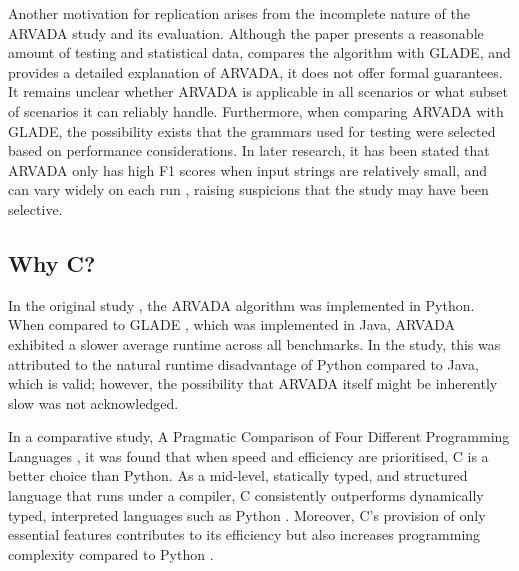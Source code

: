 \vspace{\baselineskip}

Another motivation for replication arises from the incomplete nature of the ARVADA study and its evaluation. Although the paper presents a reasonable amount of testing and statistical data, compares the algorithm with GLADE, and provides a detailed explanation of ARVADA, it does not offer formal guarantees. It remains unclear whether ARVADA is applicable in all scenarios or what subset of scenarios it can reliably handle. Furthermore, when comparing ARVADA with GLADE, the possibility exists that the grammars used for testing were selected based on performance considerations. In later research, it has been stated that ARVADA only has high F1 scores when input strings are relatively small, and can vary widely on each run \cite{arefinFastDeterministicBlackbox2024}, raising suspicions that the study may have been selective.

\subsection{Why C?}

In the original study \cite{kulkarniLearningHighlyRecursive2021}, the ARVADA algorithm was implemented in Python. When compared to GLADE \cite{bastaniSynthesizingProgramInput}, which was implemented in Java, ARVADA exhibited a slower average runtime across all benchmarks. In the study, this was attributed to the natural runtime disadvantage of Python compared to Java, which is valid; however, the possibility that ARVADA itself might be inherently slow was not acknowledged.

\vspace{\baselineskip}

In a comparative study, A Pragmatic Comparison of Four Different Programming Languages \cite{aliPragmaticComparisonFour2021}, it was found that when speed and efficiency are prioritised, C is a better choice than Python. As a mid-level, statically typed, and structured language that runs under a compiler, C consistently outperforms dynamically typed, interpreted languages such as Python \cite{kumarPythonLanguageComparison2022}. Moreover, C’s provision of only essential features contributes to its efficiency but also increases programming complexity compared to Python \cite{aliPragmaticComparisonFour2021, kumarPythonLanguageComparison2022}.

\vspace{\baselineskip}

